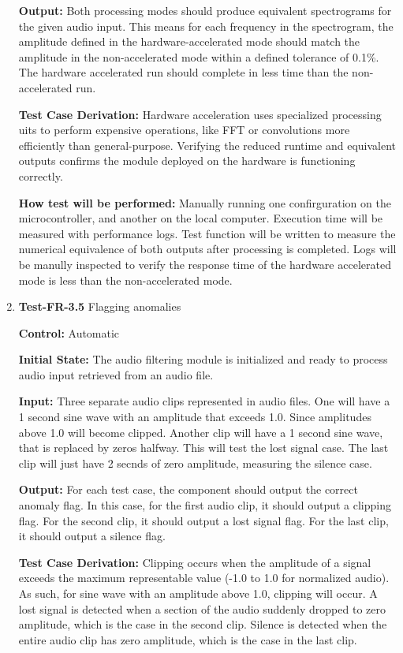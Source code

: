 \documentclass[12pt, titlepage]{article}
\begin{document}
\begin{enumerate}
\textbf{Output:}
Both processing modes should produce equivalent spectrograms for the given 
audio input. This means for each frequency in the spectrogram, the amplitude 
defined in the hardware-accelerated mode should match the amplitude in the 
non-accelerated mode within a defined tolerance of 0.1\%. The hardware 
accelerated run should complete in less time than the non-accelerated run.

\textbf{Test Case Derivation:} 
Hardware acceleration uses specialized processing uits to perform expensive 
operations, like FFT or convolutions more efficiently than general-purpose. 
Verifying the reduced runtime and equivalent outputs confirms the module 
deployed on the hardware is functioning correctly. 

\textbf{How test will be performed:}
Manually running one confirguration on the microcontroller, and another on the 
local computer. Execution time will be measured with performance logs. Test 
function will be written to measure the numerical equivalence of both outputs 
after processing is completed. Logs will be manully inspected to verify the 
response time of the hardware accelerated mode is less than the non-accelerated 
mode.

\item{\textbf{Test-FR-3.5} Flagging anomalies\\}

\textbf{Control:} Automatic
					
\textbf{Initial State:} 
The audio filtering module is initialized and ready to process audio input 
retrieved from an audio file. 
					
\textbf{Input:}
Three separate audio clips represented in audio files. One will have a 1 second 
sine wave with an amplitude that exceeds 1.0. Since amplitudes above 1.0 will 
become clipped. Another clip will have a 1 second sine wave, that is replaced 
by zeros halfway. This will test the lost signal case. The last clip will just 
have 2 secnds of zero amplitude, measuring the silence case. 
					
\textbf{Output:}
For each test case, the component should output the correct anomaly flag. 
In this case, for the first audio clip, it should output a clipping flag. 
For the second clip, it should output a lost signal flag. For the last clip, 
it should output a silence flag.

\textbf{Test Case Derivation:} 
Clipping occurs when the amplitude of a signal exceeds the maximum 
representable value (-1.0 to 1.0 for normalized audio). As such, for sine wave 
with an amplitude above 1.0, clipping will occur. A lost signal is detected 
when a section of the audio suddenly dropped to zero amplitude, which is the 
case in the second clip. Silence is detected when the entire audio clip has 
zero amplitude, which is the case in the last clip.


\end{enumerate}
\end{document}
